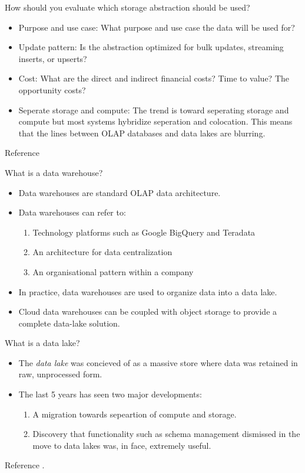 \begin{questions}
\question How should you evaluate which storage abstraction should be used?
\begin{solution}
\begin{itemize}
    \item Purpose and use case: What purpose and use case the data will be used for?
    \item Update pattern: Is the abstraction optimized for bulk updates, streaming inserts, or upserts?
    \item Cost: What are the direct and indirect financial costs? Time to value? The opportunity costs?
    \item Seperate storage and compute: The trend is toward seperating storage and compute but most systems hybridize seperation and colocation. This means that the lines between OLAP databases and data lakes are blurring.
\end{itemize}
Reference \cite[p.~219]{fode}
\end{solution}

\question What is a data warehouse?
\begin{solution}
\begin{itemize}
\item Data warehouses are standard OLAP data architecture.
\item Data warehouses can refer to: 
\begin{enumerate}
    \item Technology platforms such as Google BigQuery and Teradata
    \item An architecture for data centralization
    \item An organisational pattern within a company
\end{enumerate}
\item In practice, data warehouses are used to organize data into a data lake. 
\item Cloud data warehouses can be coupled with object storage to provide a complete data-lake solution.
\end{itemize}
\end{solution}

\question What is a data lake?

\begin{solution}
\begin{itemize}
\item The \textit{data lake} was concieved of as a massive store where data was retained in raw, unprocessed form.
\item The last 5 years has seen two major developments:
\begin{enumerate}
    \item A migration towards sepeartion of compute and storage.
    \item Discovery that functionality such as schema management dismissed in the move to data lakes was, in face, extremely useful.
\end{enumerate}
\end{itemize}
Reference \cite[p.~220]{fode}.
\end{solution}


\end{questions}
